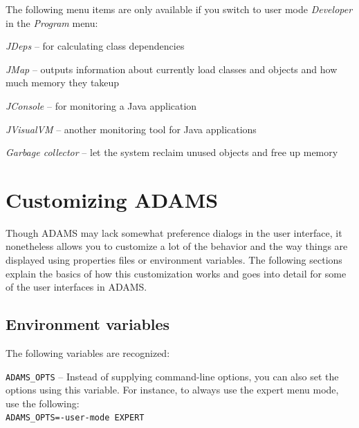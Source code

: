 The following menu items are only available if you switch to user mode
\textit{Developer} in the \textit{Program} menu:
\begin{tight_itemize}
  \item \textit{JDeps} -- for calculating class dependencies
  \item \textit{JMap} -- outputs information about currently load classes and
  objects and how much memory they takeup
  \item \textit{JConsole} -- for monitoring a Java application
  \item \textit{JVisualVM} -- another monitoring tool for Java applications
  \item \textit{Garbage collector} -- let the system reclaim unused objects
  and free up memory
\end{tight_itemize}


\chapter{Customizing ADAMS}
Though ADAMS may lack somewhat preference dialogs in the user interface, it 
nonetheless allows you to customize a lot of the behavior and the way things
are displayed using properties files or environment variables. The following 
sections explain the basics of how this customization works and goes into 
detail for some of the user interfaces in ADAMS.

\section{Environment variables}
The following variables are recognized:
\begin{tight_itemize}
	\item \texttt{ADAMS\_OPTS} -- Instead of supplying command-line options, 
	you can also set the options using this variable. For instance, to always
	use the expert menu mode, use the following:\\
	\texttt{ADAMS\_OPTS=-user-mode EXPERT}
\end{tight_itemize}

